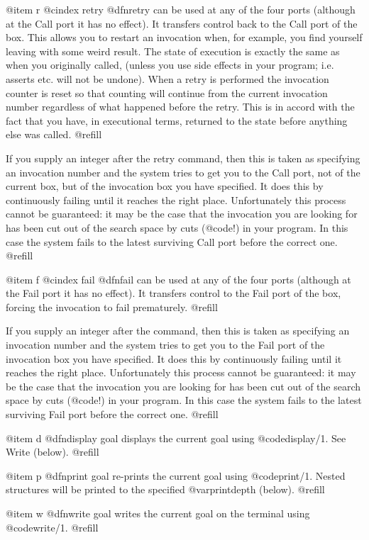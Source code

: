@item  r
@cindex retry
@dfn{retry} can be used at any of the four ports (although at the Call
port it has no effect).  It transfers control back to the Call port of
the box.  This allows you to restart an invocation when, for example,
you find yourself leaving with some weird result.  The state of
execution is exactly the same as when you originally called, (unless you
use side effects in your program; i.e. asserts etc. will not be undone).
When a retry is performed the invocation counter is reset so that
counting will continue from the current invocation number regardless of
what happened before the retry.  This is in accord with the fact that
you have, in executional terms, returned to the state before anything
else was called.  @refill

If you supply an integer after the retry command, then this is taken as
specifying an invocation number and the system tries to get you to the
Call port, not of the current box, but of the invocation box you have
specified.  It does this by continuously failing until it reaches the
right place.  Unfortunately this process cannot be guaranteed: it may be
the case that the invocation you are looking for has been cut out of the
search space by cuts (@code{!}) in your program.  In this case the
system fails to the latest surviving Call port before the correct one.
@refill

@item  f
@cindex fail
@dfn{fail} can be used at any of the four ports (although at the Fail
port it has no effect).  It transfers control to the Fail port of the
box, forcing the invocation to fail prematurely.  @refill

If you supply an integer after the command, then this is taken as
specifying an invocation number and the system tries to get you to the
Fail port of the invocation box you have specified.  It does this by
continuously failing until it reaches the right place.  Unfortunately
this process cannot be guaranteed: it may be the case that the
invocation you are looking for has been cut out of the search space by
cuts (@code{!}) in your program.  In this case the system fails to the
latest surviving Fail port before the correct one.
@refill

@item d
@dfn{display} goal displays the current goal using @code{display/1}.  See
Write (below). @refill

@item p
@dfn{print} goal re-prints the current goal using @code{print/1}.
Nested structures will be printed to the specified @var{printdepth} 
(below).  @refill

@item w
@dfn{write} goal writes the current goal on the terminal using
@code{write/1}. @refill

